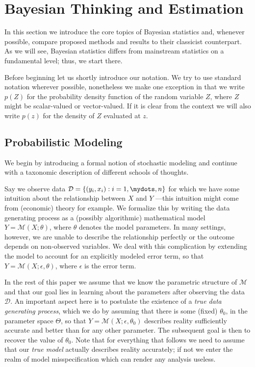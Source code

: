 \section{Bayesian Thinking and Estimation}
In this section we introduce the core topics of Bayesian statistics and, whenever possible, compare proposed methods and results to their classicist counterpart.
As we will see, Bayesian statistics differs from mainstream statistics on a fundamental level; thus, we start there.

Before beginning let us shortly introduce our notation.
We try to use standard notation wherever possible, nonetheless we make one exception in that we write $p(Z)$ for the probability density function of the random variable $Z$, where $Z$ might be scalar-valued or vector-valued.
If it is clear from the context we will also write $p(z)$ for the density of $Z$ evaluated at $z$.

\subsection{Probabilistic Modeling}
We begin by introducing a formal notion of stochastic modeling and continue with a taxonomic description of different schools of thoughts.

Say we observe data $\mathcal{D} = \{(y_i, x_i) : i=1,\mydots,n\}$ for which we have some intuition about the relationship between $X$ and $Y$ ---this intuition might come from (economic) theory for example.
We formalize this by writing the data generating process as a (possibly algorithmic) mathematical model $Y = \mathcal{M}(X; \theta)$, where $\theta$ denotes the model parameters.
In many settings, however, we are unable to describe the relationship perfectly or the outcome depends on non-observed variables.
We deal with this complication by extending the model to account for an explicitly modeled error term, so that $Y = \mathcal{M}(X; \epsilon, \theta)$, where $\epsilon$ is the error term.

In the rest of this paper we assume that we know the parametric structure of $\mathcal{M}$ and that our goal lies in learning about the parameters after observing the data $\mathcal{D}$.
An important aspect here is to postulate the existence of a \textit{true data generating process}, which we do by assuming that there is some (fixed) $\theta_0$, in the parameter space $\Theta$, so that $Y = \mathcal{M}(X; \epsilon, \theta_0)$ describes reality sufficiently accurate and better than for any other parameter.
The subsequent goal is then to recover the value of $\theta_0$.
Note that for everything that follows we need to assume that our \emph{true model} actually describes reality accurately; if not we enter the realm of model misspecification which can render any analysis useless.

